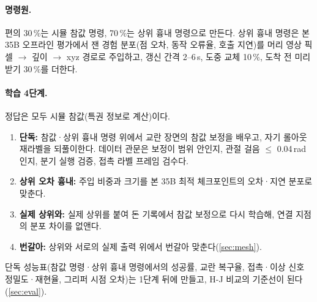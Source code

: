 \paragraph{명령원.} 편의 30\,\%는 시뮬 참값 명령, 70\,\%는 상위 흉내 명령으로 만든다. 상위 흉내 명령은 본 35B 오프라인 평가에서 잰 경험 분포(점 오차, 동작 오류율, 호출 지연)를 머리 영상 픽셀 $\rightarrow$ 깊이 $\rightarrow$ xyz 경로로 주입하고, 갱신 간격 2--6\,s, 도중 교체 10\,\%, 도착 전 미리 받기 30\,\%를 더한다.

\paragraph{학습 4단계.} 정답은 모두 시뮬 참값(특권 정보로 계산)이다.
\begin{enumerate}
  \item \textbf{단독:} 참값·상위 흉내 명령 위에서 교란 장면의 참값 보정을 배우고, 자기 롤아웃 재라벨을 되풀이한다. 데이터 관문은 보정이 범위 안인지, 관절 걸음 $\le$ 0.04\,rad인지, 분기 실행 검증, 접촉 라벨 프레임 검수다.
  \item \textbf{상위 오차 흉내:} 주입 비중과 크기를 본 35B 최적 체크포인트의 오차·지연 분포로 맞춘다.
  \item \textbf{실제 상위와:} 실제 상위를 붙여 돈 기록에서 참값 보정으로 다시 학습해, 연결 지점의 분포 차이를 없앤다.
  \item \textbf{번갈아:} 상위와 서로의 실제 출력 위에서 번갈아 맞춘다(\cref{sec:mesh}).
\end{enumerate}
단독 성능표(참값 명령·상위 흉내 명령에서의 성공률, 교란 복구율, 접촉·이상 신호 정밀도·재현율, 그리퍼 시점 오차)는 1단계 뒤에 만들고, H-J 비교의 기준선이 된다(\cref{sec:eval}).
